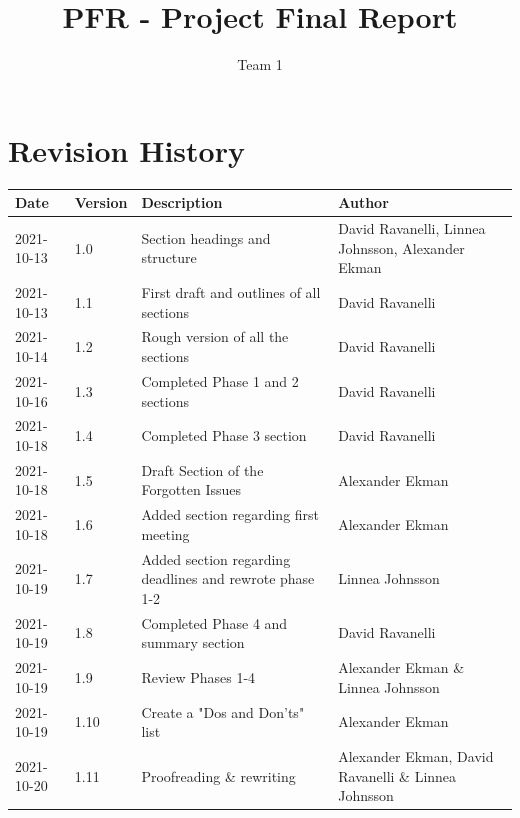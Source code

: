 \documentclass{article}
\title{PFR - Project Final Report}
\author{Team 1}
\begin{document}
\date{}
\maketitle
\thispagestyle{fancy}
\newpage

\section*{Revision History}
\begin{table}[h]
    \centering
    \begin{tabular}{|l|l|p{55mm}|p{35mm}|}
    \hline
    Date & Version & Description & Author \\ 
    \hline\hline 
    2021-10-13 & 1.0 & Section headings and structure & David Ravanelli, Linnea Johnsson, Alexander Ekman  \\
    \hline
    2021-10-13 & 1.1 & First draft and outlines of all sections & David Ravanelli  \\
    \hline
    2021-10-14 & 1.2 & Rough version of all the sections & David Ravanelli \\
    \hline
    2021-10-16 & 1.3 & Completed Phase 1 and 2 sections & David Ravanelli \\
    \hline
    2021-10-18 & 1.4 & Completed Phase 3 section & David Ravanelli \\
    \hline
    2021-10-18 & 1.5 & Draft Section of the Forgotten Issues & Alexander Ekman \\
    \hline
    2021-10-18 & 1.6 & Added section regarding first meeting & Alexander Ekman \\
    \hline
    2021-10-19 & 1.7 & Added section regarding deadlines and rewrote phase 1-2 & Linnea Johnsson \\
    \hline
    2021-10-19 & 1.8 & Completed Phase 4 and summary section & David Ravanelli \\
    \hline
    2021-10-19 & 1.9 & Review Phases 1-4 & Alexander Ekman \& Linnea Johnsson \\
    \hline
    2021-10-19 & 1.10 & Create a "Dos and Don'ts" list & Alexander Ekman \\
    \hline
    2021-10-20 & 1.11 & Proofreading \& rewriting & Alexander Ekman, David Ravanelli \& Linnea Johnsson \\
    \hline
    \end{tabular}
    \label{tab:history}
\end{table}
\newpage
\end{document}
